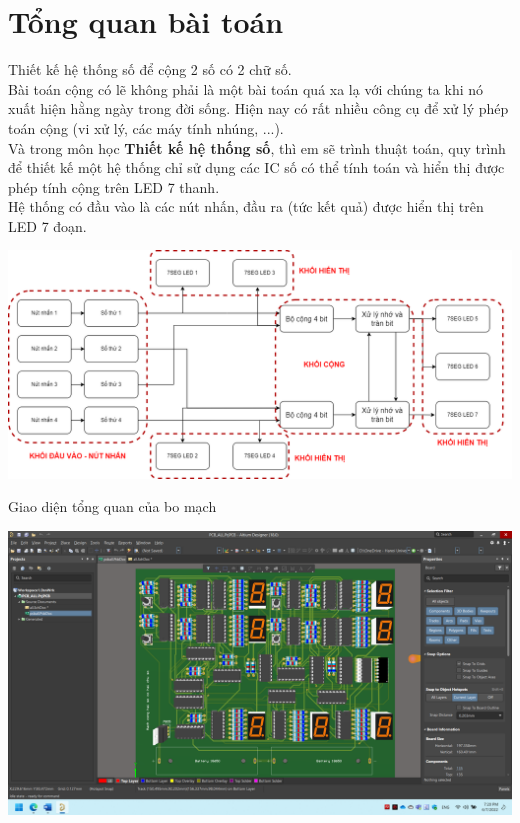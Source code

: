\documentclass[10pt,a4paper]{report}
\begin{document}
\chapter{Tổng quan bài toán}

\hspace{0.3cm} Thiết kế hệ thống số để cộng 2 số có 2 chữ số.\\

Bài toán cộng có lẽ không phải là một bài toán quá xa lạ với chúng ta khi nó xuất hiện hằng ngày trong đời sống. Hiện nay có rất nhiều công cụ để xử lý phép toán cộng (vi xử lý, các máy tính nhúng, ...). \\
Và trong môn học \textbf{Thiết kế hệ thống số}, thì em sẽ trình thuật toán, quy trình để thiết kế một hệ thống chỉ sử dụng các IC số có thể tính toán và hiển thị được phép tính cộng trên LED 7 thanh.\\

Hệ thống có đầu vào là các nút nhấn, đầu ra (tức kết quả) được hiển thị trên LED 7 đoạn.\\
\begin{center}
	\includegraphics[width=0.9\linewidth]{sodo}
\end{center}

Giao diện tổng quan của bo mạch\\
\begin{center}
	\includegraphics[width=0.7\linewidth]{img_all}
\end{center}
\vspace{1cm}
\end{document}
